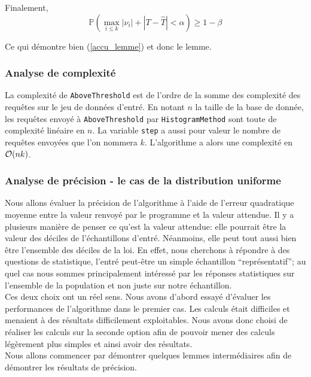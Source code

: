Finalement, 
\[
    \mathbb P\left( \max_{i \leq k} |\nu_i| + |T - \hat T| < \alpha  \right)  \geq 1 - \beta
\]

Ce qui démontre bien (\ref{accu_lemme}) et donc le lemme.\\

\subsubsection{Analyse de complexité}

La complexité de \texttt{AboveThreshold} est de l'ordre de la somme des complexité des requêtes sur le jeu de données d'entré. En notant \(n\) la taille de la base de donnée, les requêtes envoyé à \texttt{AboveThreshold} par \texttt{HistogramMethod} sont toute de complexité linéaire en \(n\). La variable \texttt{step} a aussi pour valeur le nombre de requêtes envoyées que l'on nommera \(k\). L'algorithme a alors une complexité en \(\mathcal{O}(nk)\).

\subsubsection{Analyse de précision - le cas de la distribution uniforme}

Nous allons évaluer la précision de l'algorithme à l'aide de l'erreur quadratique moyenne entre la valeur renvoyé par le programme et la valeur attendue. Il y a plusieurs manière de penser ce qu'est la valeur attendue: elle pourrait être la valeur des déciles de l'échantillons d'entré. Néanmoins, elle peut tout aussi bien être l'ensemble des déciles de la loi. En effet, nous cherchons à répondre à des questions de statistique, l'entré peut-être un simple échantillon ``représentatif'';  au quel cas nous sommes principalement intéressé par les réponses statistiques sur l'ensemble de la population et non juste sur notre échantillon.\\

Ces deux choix ont un réel sens. Nous avons d'abord essayé d'évaluer les performances de l'algorithme dans le premier cas. Les calculs était difficiles et menaient à des résultats difficilement exploitables. Nous avons donc choisi de réaliser les calculs sur la seconde option afin de pouvoir mener des calculs légèrement plus simples et ainsi avoir des résultats.\\

Nous allons commencer par démontrer quelques lemmes intermédiaires afin de démontrer les résultats de précision.\\

